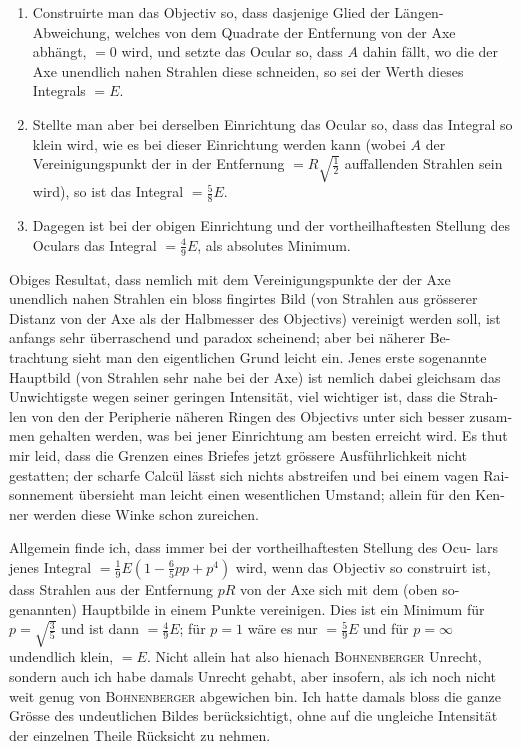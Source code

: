 \documentclass[12pt,a4paper]{article}
\begin{document}
\begin{enumerate}
\item Construirte man das Objectiv so, dass dasjenige Glied der Längen-Abweichung, welches von dem Quadrate der Entfernung von der Axe abhängt, $= 0$ wird, und setzte das Ocular so, dass $A$ dahin fällt, wo die der Axe unendlich nahen Strahlen diese schneiden, so sei der Werth dieses Integrals $= E$.
\item Stellte man aber bei derselben Einrichtung das Ocular so, dass das Integral so klein wird, wie es bei dieser Einrichtung werden kann (wobei $A$ der Vereinigungspunkt der in der Entfernung $= R\sqrt{\tfrac{1}{2}}$ auffallenden Strahlen sein wird), so ist das Integral $= \tfrac{5}{8}E$.
\item Dagegen ist bei der obigen Einrichtung und der vortheilhaftesten Stellung des Oculars das Integral $= \tfrac{4}{9}E$, als absolutes Minimum.
\end{enumerate}

Obiges Resultat, dass nemlich mit dem Vereinigungspunkte der der Axe unendlich nahen Strahlen ein bloss fingirtes Bild (von Strahlen aus grösserer Distanz von der Axe als der Halbmesser des Objectivs) vereinigt werden soll, ist anfangs sehr überraschend und paradox scheinend; aber bei näherer Be-
trachtung sieht man den eigentlichen Grund leicht ein. Jenes erste sogenannte 
Hauptbild (von Strahlen sehr nahe bei der Axe) ist nemlich dabei gleichsam das 
Unwichtigste wegen seiner geringen Intensität, viel wichtiger ist, dass die Strah-
len von den der Peripherie näheren Ringen des Objectivs unter sich besser zusam-
men gehalten werden, was bei jener Einrichtung am besten erreicht wird. Es 
thut mir leid, dass die Grenzen eines Briefes jetzt grössere Ausführlichkeit nicht 
gestatten; der scharfe Calcül lässt sich nichts abstreifen und bei einem vagen Rai-
sonnement übersieht man leicht einen wesentlichen Umstand; allein für den Ken-
ner werden diese Winke schon zureichen.

Allgemein finde ich, dass immer bei der vortheilhaftesten Stellung des Ocu-
lars jenes Integral $= \tfrac{1}{9}E(1 - \tfrac{6}{5}pp + p^4)$ wird, wenn das Objectiv so construirt 
ist, dass Strahlen aus der Entfernung $pR$ von der Axe sich mit dem (oben so-
genannten) Hauptbilde in einem Punkte vereinigen. Dies ist ein Minimum 
für $p = \sqrt{\tfrac{3}{5}}$ und ist dann $= \tfrac{4}{9}E$; für $p = 1$ wäre es nur $= \tfrac{5}{9}E$ und für 
$p = \infty$ undendlich klein, $= E$. Nicht allein hat also hienach \textsc{Bohnenberger} 
Unrecht, sondern auch ich habe damals Unrecht gehabt, aber insofern, als ich 
noch nicht weit genug von \textsc{Bohnenberger} abgewichen bin. Ich hatte damals bloss 
die ganze Grösse des undeutlichen Bildes berücksichtigt, ohne auf die ungleiche 
Intensität der einzelnen Theile Rücksicht zu nehmen.
\end{document}
